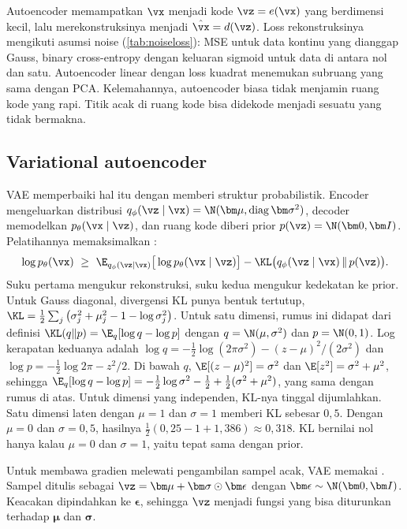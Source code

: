 Autoencoder memampatkan $\vx$ menjadi kode $\vz=e(\vx)$ yang berdimensi kecil, lalu
merekonstruksinya menjadi $\hat\vx=d(\vz)$. Loss rekonstruksinya mengikuti asumsi noise
(\cref{tab:noiseloss}): MSE untuk data kontinu yang dianggap Gauss, binary cross-entropy dengan
keluaran sigmoid untuk data di antara nol dan satu. Autoencoder linear dengan loss kuadrat
menemukan subruang yang sama dengan PCA. Kelemahannya, autoencoder biasa tidak menjamin ruang kode
yang rapi. Titik acak di ruang kode bisa didekode menjadi sesuatu yang tidak bermakna.

\subsection{Variational autoencoder}

VAE \citep{kingma2014} memperbaiki hal itu dengan memberi struktur probabilistik. Encoder
mengeluarkan distribusi $q_\phi(\vz\mid\vx)=\N(\bm\mu,\mathrm{diag}\,\bm\sigma^2)$, decoder memodelkan
$p_\theta(\vx\mid\vz)$, dan ruang kode diberi prior $p(\vz)=\N(\bm0,\bm I)$. Pelatihannya
memaksimalkan :
\begin{equation}
\log p_\theta(\vx)\ \ge\ \E_{q_\phi(\vz\mid\vx)}\big[\log p_\theta(\vx\mid\vz)\big]
-\KL\big(q_\phi(\vz\mid\vx)\,\|\,p(\vz)\big).
\label{eq:elbo6}
\end{equation}
Suku pertama mengukur rekonstruksi, suku kedua mengukur kedekatan ke prior. Untuk Gauss diagonal,
divergensi KL punya bentuk tertutup,
$\KL=\tfrac12\sum_j\big(\sigma_j^2+\mu_j^2-1-\log\sigma_j^2\big)$. Untuk satu dimensi, rumus ini
didapat dari definisi $\KL(q\|p)=\E_q[\log q-\log p]$ dengan $q=\N(\mu,\sigma^2)$ dan $p=\N(0,1)$. Log
kerapatan keduanya adalah $\log q=-\tfrac12\log(2\pi\sigma^2)-(z-\mu)^2/(2\sigma^2)$ dan
$\log p=-\tfrac12\log2\pi-z^2/2$. Di bawah $q$, $\E[(z-\mu)^2]=\sigma^2$ dan $\E[z^2]=\sigma^2+\mu^2$, sehingga
$\E_q[\log q-\log p]=-\tfrac12\log\sigma^2-\tfrac12+\tfrac12(\sigma^2+\mu^2)$, yang sama dengan rumus di
atas. Untuk dimensi yang independen, KL-nya tinggal dijumlahkan. Satu dimensi laten dengan
$\mu=1$ dan $\sigma=1$ memberi KL sebesar $0{,}5$. Dengan $\mu=0$ dan $\sigma=0{,}5$, hasilnya
$\tfrac12(0{,}25-1+1{,}386)\approx0{,}318$. KL bernilai nol hanya kalau $\mu=0$ dan $\sigma=1$, yaitu
tepat sama dengan prior.

Untuk membawa gradien melewati pengambilan sampel acak, VAE memakai .
Sampel ditulis sebagai $\vz=\bm\mu+\bm\sigma\odot\bm\epsilon$ dengan $\bm\epsilon\sim\N(\bm0,\bm I)$.
Keacakan dipindahkan ke $\bm\epsilon$, sehingga $\vz$ menjadi fungsi yang bisa diturunkan terhadap
$\bm\mu$ dan $\bm\sigma$.

